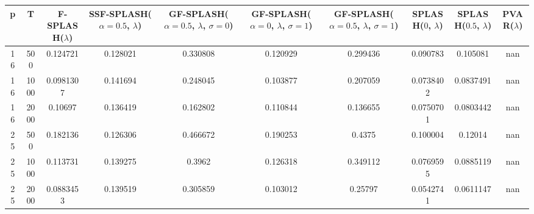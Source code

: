 \begin{tabular}{cccccccccc}
\hline
  p  &  T   &  F-SPLASH($\lambda$)  &  SSF-SPLASH($\alpha=0.5$, $\lambda$)  &  GF-SPLASH($\alpha=0.5$, $\lambda$, $\sigma=0$)  &  GF-SPLASH($\alpha=0$, $\lambda$, $\sigma=1$)  &  GF-SPLASH($\alpha=0.5$, $\lambda$, $\sigma=1$)  &  SPLASH($0$, $\lambda$)  &  SPLASH($0.5$, $\lambda$)  &  PVAR($\lambda$)  \\
\hline
 16  & 500  &       0.124721        &               0.128021                &                     0.330808                     &                    0.120929                    &                     0.299436                     &         0.090783         &          0.105081          &        nan        \\
 16  & 1000 &       0.0981307       &               0.141694                &                     0.248045                     &                    0.103877                    &                     0.207059                     &        0.0738402         &         0.0837491          &        nan        \\
 16  & 2000 &        0.10697        &               0.136419                &                     0.162802                     &                    0.110844                    &                     0.136655                     &        0.0750701         &         0.0803442          &        nan        \\
 25  & 500  &       0.182136        &               0.126306                &                     0.466672                     &                    0.190253                    &                      0.4375                      &         0.100004         &          0.12014           &        nan        \\
 25  & 1000 &       0.113731        &               0.139275                &                      0.3962                      &                    0.126318                    &                     0.349112                     &        0.0769595         &         0.0885119          &        nan        \\
 25  & 2000 &       0.0883453       &               0.139519                &                     0.305859                     &                    0.103012                    &                     0.25797                      &        0.0542741         &         0.0611147          &        nan        \\
\hline
\end{tabular}